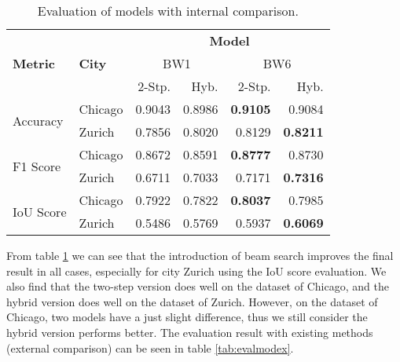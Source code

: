 \begin{table}[!h]
	\centering
	\caption[Evaluation of models with the internal comparison]{Evaluation of models with internal comparison.}
	\label{tab:evalmodin}
	\begin{tabular}{l|l|r|r|r|r}
	\hline
	\multirow{3}{*}{\textbf{Metric}} & \multirow{3}{*}{\textbf{City}} & \multicolumn{4}{c}{\textbf{Model}} \\ \cline{3-6}
	& & \multicolumn{2}{c|}{BW1\footnotemark[1]} & \multicolumn{2}{c}{BW6\footnotemark[1]} \\ \cline{3-6}
	& & 2-Stp.\footnotemark[1] & Hyb.\footnotemark[1] & 2-Stp.\footnotemark[1] & Hyb.\footnotemark[1] \\ \hline
	\multirow{2}{*}{Accuracy} & Chicago & 0.9043 & 0.8986 & \textbf{0.9105} & 0.9084 \\ \cline{2-6}
	& Zurich & 0.7856 & 0.8020 & 0.8129 & \textbf{0.8211} \\ \hline
	\multirow{2}{*}{F1 Score} & Chicago & 0.8672 & 0.8591 & \textbf{0.8777} & 0.8730 \\ \cline{2-6}
	& Zurich & 0.6711 & 0.7033 & 0.7171 & \textbf{0.7316} \\ \hline
	\multirow{2}{*}{IoU Score} & Chicago & 0.7922 & 0.7822 & \textbf{0.8037} & 0.7985 \\ \cline{2-6}
	& Zurich & 0.5486 & 0.5769 & 0.5937 & \textbf{0.6069} \\
	\hline
\end{tabular}
\end{table}

From table \ref{tab:evalmodin} we can see that the introduction of beam search improves the final result in all cases, especially for city Zurich using the IoU score evaluation. We also find that the two-step version does well on the dataset of Chicago, and the hybrid version does well on the dataset of Zurich. However, on the dataset of Chicago, two models have a just slight difference, thus we still consider the hybrid version performs better. The evaluation result with existing methods (external comparison) can be seen in table \ref{tab:evalmodex}.

